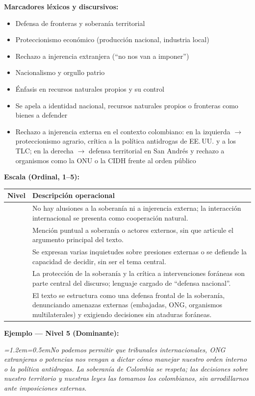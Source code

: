 \documentclass[11pt,letterpaper]{article}
\newcommand{\ejemplo}[2]{%
  \par\smallskip\noindent\textbf{Ejemplo — #1:}\par\nopagebreak
  \begingroup\itshape\small\leftskip=1.2em\rightskip=0.5em\noindent #2\par\endgroup\smallskip}
\begin{document}
\textbf{Marcadores léxicos y discursivos:}
\begin{itemize}
\item Defensa de fronteras y soberanía territorial
\item Proteccionismo económico (producción nacional, industria local)
\item Rechazo a injerencia extranjera (“no nos van a imponer”)
\item Nacionalismo y orgullo patrio
\item Énfasis en recursos naturales propios y su control
\item Se apela a identidad nacional, recursos naturales propios o fronteras como bienes a defender
\item Rechazo a injerencia externa en el contexto colombiano: en la izquierda $\rightarrow$ proteccionismo
agrario, crítica a la política antidrogas de EE.\,UU. y a los TLC; en la derecha $\rightarrow$ defensa
territorial en San Andrés y rechazo a organismos como la ONU o la CIDH frente al orden público
\end{itemize}

\textbf{Escala (Ordinal, 1–5):}
\begin{longtable}{@{}>{\centering\arraybackslash}p{1.1cm}p{14.3cm}@{}}
\toprule \textbf{Nivel} & \textbf{Descripción operacional}\\ \midrule\endhead
1 & No hay alusiones a la soberanía ni a injerencia externa; la interacción internacional se presenta como
cooperación natural.\\
\addlinespace
2 & Mención puntual a soberanía o actores externos, sin que articule el argumento principal del texto.\\
\addlinespace
3 & Se expresan varias inquietudes sobre presiones externas o se defiende la capacidad de decidir, sin ser el
tema central.\\
\addlinespace
4 & La protección de la soberanía y la crítica a intervenciones foráneas son parte central del discurso;
lenguaje cargado de “defensa nacional”.\\
\addlinespace
5 & El texto se estructura como una defensa frontal de la soberanía, denunciando amenazas externas
(embajadas, ONG, organismos multilaterales) y exigiendo decisiones sin ataduras foráneas.\\
\bottomrule
\end{longtable}

\ejemplo{Nivel 5 (Dominante)}{No podemos permitir que tribunales internacionales, ONG extranjeras o
potencias nos vengan a dictar cómo manejar nuestro orden interno o la política antidrogas. La soberanía de
Colombia se respeta; las decisiones sobre nuestro territorio y nuestras leyes las tomamos los colombianos,
sin arrodillarnos ante imposiciones externas.}
\end{document}
